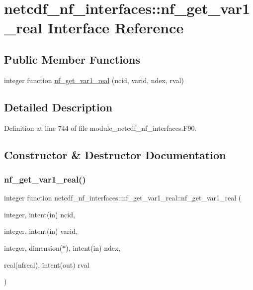 \hypertarget{interfacenetcdf__nf__interfaces_1_1nf__get__var1__real}{}\section{netcdf\+\_\+nf\+\_\+interfaces\+:\+:nf\+\_\+get\+\_\+var1\+\_\+real Interface Reference}
\label{interfacenetcdf__nf__interfaces_1_1nf__get__var1__real}
\subsection*{Public Member Functions}
\begin{DoxyCompactItemize}
\item 
integer function \hyperlink{interfacenetcdf__nf__interfaces_1_1nf__get__var1__real_a19c3c3a1c25497e4c72b0e157c46e31e}{nf\+\_\+get\+\_\+var1\+\_\+real} (ncid, varid, ndex, rval)
\end{DoxyCompactItemize}


\subsection{Detailed Description}


Definition at line 744 of file module\+\_\+netcdf\+\_\+nf\+\_\+interfaces.\+F90.



\subsection{Constructor \& Destructor Documentation}
\mbox{\label{interfacenetcdf__nf__interfaces_1_1nf__get__var1__real_a19c3c3a1c25497e4c72b0e157c46e31e}} 
\subsubsection{\texorpdfstring{nf\+\_\+get\+\_\+var1\+\_\+real()}{nf\_get\_var1\_real()}}
{\footnotesize\ttfamily integer function netcdf\+\_\+nf\+\_\+interfaces\+::nf\+\_\+get\+\_\+var1\+\_\+real\+::nf\+\_\+get\+\_\+var1\+\_\+real (\begin{DoxyParamCaption}\item[{integer, intent(in)}]{ncid,  }\item[{integer, intent(in)}]{varid,  }\item[{integer, dimension($\ast$), intent(in)}]{ndex,  }\item[{real(nfreal), intent(out)}]{rval }\end{DoxyParamCaption})}



